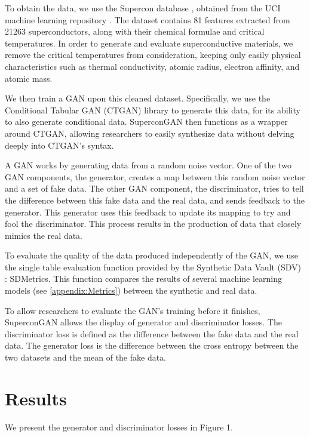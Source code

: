 \documentclass[11pt]{article}
\begin{document}
To obtain the data, we use the Supercon database \cite{hamidieh2018}, obtained from the UCI machine learning repository \cite{UCI}.
The dataset contains 81 features extracted from 21263 superconductors, along with their chemical formulae and critical temperatures.
In order to generate and evaluate superconductive materials, we remove the critical temperatures from consideration, keeping only easily physical characteristics such as thermal conductivity, atomic radius, electron affinity, and atomic mass.

We then train a GAN upon this cleaned dataset. Specifically, we use the Conditional Tabular GAN (CTGAN) library \cite{CTGAN} to generate this data, for its ability to also generate conditional data.
SuperconGAN then functions as a wrapper around CTGAN, allowing researchers to easily synthesize data without delving deeply into CTGAN's syntax.

A GAN works \cite{GAN} by generating data from a random noise vector. One of the two GAN components, the generator, creates a map between this random noise vector and a set of fake data.
The other GAN component, the discriminator, tries to tell the difference between this fake data and the real data, and sends feedback to the generator.
This generator uses this feedback to update its mapping to try and fool the discriminator.
This process results in the production of data that closely mimics the real data.

To evaluate the quality of the data produced independently of the GAN, we use the single table evaluation function provided by the Synthetic Data Vault (SDV) \cite{patki_wedge_veeramachaneni_2016}: SDMetrics.
This function compares the results of several machine learning models (see \ref{appendix:Metrics}) between the synthetic and real data.

To allow researchers to evaluate the GAN's training before it finishes, SuperconGAN allows the display of generator and discriminator losses.
The discriminator loss is defined as the difference between the fake data and the real data.
The generator loss is the difference between the cross entropy between the two datasets and the mean of the fake data.

\section{Results}
We present the generator and discriminator losses in Figure 1.

\newpage
\end{document}
